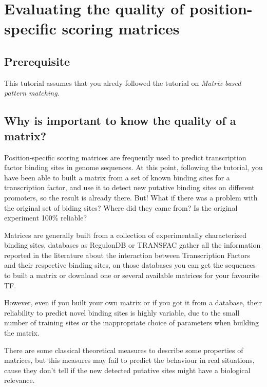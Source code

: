 
\chapter{Evaluating the quality of position-specific scoring matrices}

\section{Prerequisite}

This tutorial assumes that you alredy followed the tutorial on \textit{Matrix based pattern matching}.

\section{Why is important to know the quality of a matrix?}

Position-specific scoring matrices are frequently used to predict
transcription factor binding sites in genome sequences.  At this
point, following the tutorial, you have been able to built a matrix
from a set of known binding sites for a transcription factor, and use
it to detect new putative binding sites on different promoters, so the
result is already there. But! What if there was a problem with the
original set of biding sites? Where did they came from? Is the original
experiment 100\% reliable?

Matrices are generally built from a collection of experimentally
characterized binding sites, databases as RegulonDB or TRANSFAC
gather all the information reported in the literature about the
interaction between Transcription Factors and their respective
binding sites, on those databases you can get the sequences to built a
matrix or download one or several available matrices for your
favourite TF.

However, even if you built your own matrix or if you got it from a
database, their reliability to predict novel binding sites is highly
variable, due to the small number of training sites or the
inappropriate choice of parameters when building the matrix.

There are some classical theoretical measures to describe some
properties of matrices, but this measures may fail to predict the
behaviour in real situations, cause they don't tell if the new detected
putative sites might have a biological relevance.

